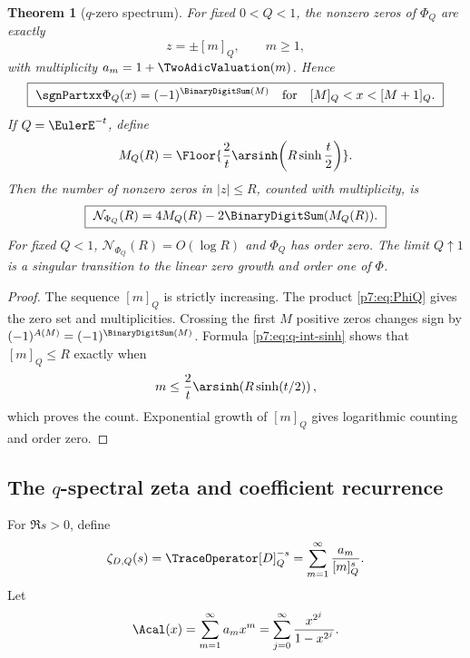 \documentclass[11pt]{article}
\numberwithin{equation}{section}
\newtheorem{theorem}{Theorem}[section]
\theoremstyle{definition}
\theoremstyle{remark}
\begin{document}
\begin{theorem}[$q$-zero spectrum]\label{p7:thm:q-zeros}
For fixed $0<Q<1$, the nonzero zeros of $\Phi_Q$ are exactly
\begin{equation}\label{p7:eq:q-zero-set}
 z=\pm[m]_Q,\qquad m\ge1,
\end{equation}
with multiplicity $a_m=1+\TwoAdicValuation(m)$.  Hence
\begin{equation}\label{p7:eq:q-sign}
 \boxed{\ \sgnPartxx\Phi_Q(x)=(-1)^{\BinaryDigitSum(M)}
 \quad\text{for}\quad [M]_Q<x<[M+1]_Q.\ }
\end{equation}
If $Q=\EulerE^{-t}$, define
\begin{equation}\label{p7:eq:MQ}
 M_Q(R)=\Floor{
 \frac2t\arsinh\!\left(R\sinh\frac t2\right)
 }.
\end{equation}
Then the number of nonzero zeros in $|z|\le R$, counted with multiplicity, is
\begin{equation}\label{p7:eq:q-zero-count}
 \boxed{\ \mathcal N_{\Phi_Q}(R)
 =4M_Q(R)-2\BinaryDigitSum(M_Q(R)).\ }
\end{equation}
For fixed $Q<1$, $\mathcal N_{\Phi_Q}(R)=O(\log R)$ and $\Phi_Q$ has order zero.  The limit $Q\uparrow1$ is a singular transition to the linear zero growth and order one of $\Phi$.
\end{theorem}

\begin{proof}
The sequence $[m]_Q$ is strictly increasing.  The product \cref{p7:eq:PhiQ} gives the zero set and multiplicities.  Crossing the first $M$ positive zeros changes sign by $(-1)^{A(M)}=(-1)^{\BinaryDigitSum(M)}$.  Formula \cref{p7:eq:q-int-sinh} shows that $[m]_Q\le R$ exactly when
\[
 m\le\frac2t\arsinh\!\left(R\sinh(t/2)\right),
\]
which proves the count.  Exponential growth of $[m]_Q$ gives logarithmic counting and order zero.
\end{proof}

\subsection{The $q$-spectral zeta and coefficient recurrence}

For $\Re s>0$, define
\begin{equation}\label{p7:eq:zetaDQ}
 \zeta_{D,Q}(s)=\TraceOperator[D]_Q^{-s}
 =\sum_{m=1}^{\infty}\frac{a_m}{[m]_Q^s}.
\end{equation}
Let
\begin{equation}\label{p7:eq:A-lambert}
 \Acal(x)=\sum_{m=1}^{\infty}a_mx^m
 =\sum_{j=0}^{\infty}\frac{x^{2^j}}{1-x^{2^j}}.
\end{equation}
\end{document}

